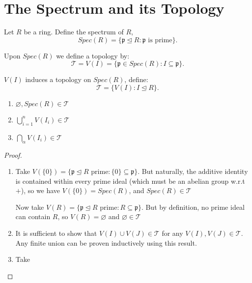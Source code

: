 \documentclass{article}
\theoremstyle{plain}%
\newtheorem[L]{thm}{Theorem}[section]
\newtheorem[L]{lem}[thm]{Lemma}
\newtheorem[L]{prop}[thm]{Proposition}
\theoremstyle{definition}
\newtheorem[M]{defn}{Definition}[section]
\newtheorem[M]{exmp}{Example}[section]
\theoremstyle{remark}
\begin{document}
\section{The Spectrum and its Topology}
\begin{defn}
Let $R$ be a ring. Define the spectrum of $R$,
\[Spec(R)=\{\mathfrak{p}\trianglelefteq R: \mathfrak{p} \text{ is prime}\} .\] 
\end{defn}
\begin{defn}
    Upon $Spec(R)$ we define a topology by:
    \[ \mathcal{T}=V(I)=\{\mathfrak{p}\in Spec(R):I\subseteq \mathfrak{p}\} .\] 
\end{defn}
\begin{prop}
    $V(I)$ induces a topology on $Spec(R)$, define:
    \[
    \mathcal{T}=\{V(I):I\trianglelefteq R\} 
    .\] 
    \begin{enumerate}
        \item $\varnothing,Spec(R)\in \mathcal{T}$
        \item $\bigcup_{i=1}^{n}V(I_i)\in \mathcal{T}$
        \item $\bigcap_{\alpha}^{}V(I_i)\in \mathcal{T}$
    \end{enumerate}
\end{prop}
\begin{proof} 
\begin{enumerate}
\item Take $V(\{0\} )=\{\mathfrak{p}\trianglelefteq R \text{ prime}: \{0\} \subseteq \mathfrak{p}\} $. But naturally, the additive identity is contained within every prime ideal (which must be an abelian group w.r.t $+$), so we have  $V(\{0\} )=Spec(R)$, and $Spec(R)\in \mathcal{T}$

Now take $V(R)=\{\mathfrak{p}\trianglelefteq R \text{ prime}: R\subseteq \mathfrak{p}\} $. But by definition, no prime ideal can contain $R$, so $V(R)=\varnothing$ and $\varnothing\in \mathcal{T}$
\item It is sufficient to show that $V(I)\cup V(J)\in \mathcal{T}$ for any $V(I),V(J)\in \mathcal{T}$. Any finite union can be proven inductively using this result.

\item Take 
\end{enumerate}
\end{proof}
\end{document}
